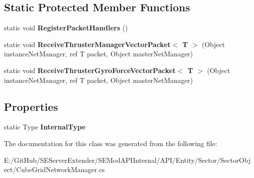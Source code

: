 \subsection*{Static Protected Member Functions}
\begin{DoxyCompactItemize}
\item 
\hypertarget{class_s_e_mod_a_p_i_internal_1_1_a_p_i_1_1_entity_1_1_sector_1_1_sector_object_1_1_cube_grid_network_manager_ab6e71f0e181b6c61444ba4490af5b215}{}static void {\bfseries Register\+Packet\+Handlers} ()\label{class_s_e_mod_a_p_i_internal_1_1_a_p_i_1_1_entity_1_1_sector_1_1_sector_object_1_1_cube_grid_network_manager_ab6e71f0e181b6c61444ba4490af5b215}

\item 
\hypertarget{class_s_e_mod_a_p_i_internal_1_1_a_p_i_1_1_entity_1_1_sector_1_1_sector_object_1_1_cube_grid_network_manager_aabf515929fcd9c56dd174da496d0dd60}{}static void {\bfseries Receive\+Thruster\+Manager\+Vector\+Packet$<$ T $>$} (Object instance\+Net\+Manager, ref T packet, Object master\+Net\+Manager)\label{class_s_e_mod_a_p_i_internal_1_1_a_p_i_1_1_entity_1_1_sector_1_1_sector_object_1_1_cube_grid_network_manager_aabf515929fcd9c56dd174da496d0dd60}

\item 
\hypertarget{class_s_e_mod_a_p_i_internal_1_1_a_p_i_1_1_entity_1_1_sector_1_1_sector_object_1_1_cube_grid_network_manager_ad1068209d58c66702cc463a9429049f8}{}static void {\bfseries Receive\+Thruster\+Gyro\+Force\+Vector\+Packet$<$ T $>$} (Object instance\+Net\+Manager, ref T packet, Object master\+Net\+Manager)\label{class_s_e_mod_a_p_i_internal_1_1_a_p_i_1_1_entity_1_1_sector_1_1_sector_object_1_1_cube_grid_network_manager_ad1068209d58c66702cc463a9429049f8}

\end{DoxyCompactItemize}
\subsection*{Properties}
\begin{DoxyCompactItemize}
\item 
\hypertarget{class_s_e_mod_a_p_i_internal_1_1_a_p_i_1_1_entity_1_1_sector_1_1_sector_object_1_1_cube_grid_network_manager_abf60a2856242c4293cace0f4cb9e981a}{}static Type {\bfseries Internal\+Type}\label{class_s_e_mod_a_p_i_internal_1_1_a_p_i_1_1_entity_1_1_sector_1_1_sector_object_1_1_cube_grid_network_manager_abf60a2856242c4293cace0f4cb9e981a}

\end{DoxyCompactItemize}


The documentation for this class was generated from the following file\+:\begin{DoxyCompactItemize}
\item 
E\+:/\+Git\+Hub/\+S\+E\+Server\+Extender/\+S\+E\+Mod\+A\+P\+I\+Internal/\+A\+P\+I/\+Entity/\+Sector/\+Sector\+Object/Cube\+Grid\+Network\+Manager.\+cs\end{DoxyCompactItemize}
